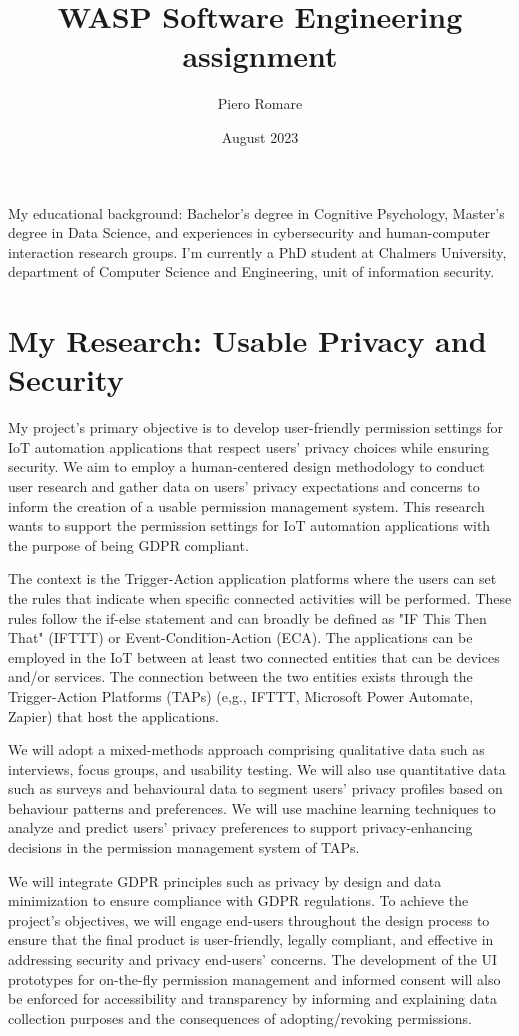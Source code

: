 \documentclass[11pt]{article}
\title{WASP Software Engineering assignment}
\author{Piero Romare}
\date{August 2023}
\begin{document}
\maketitle

My educational background: Bachelor's degree in Cognitive Psychology, Master's degree in Data Science, and experiences in cybersecurity and human-computer interaction research groups. I'm currently a PhD student at Chalmers University, department of Computer Science and Engineering, unit of information security.

\section{My Research: Usable Privacy and Security}\label{sec:1}
My project's primary objective is to develop user-friendly permission settings for IoT automation applications that respect users' privacy choices while ensuring security. We aim to employ a human-centered design methodology to conduct user research and gather data on users' privacy expectations and concerns to inform the creation of a usable permission management system. This research wants to support the permission settings for IoT automation applications with the purpose of being GDPR compliant.

The context is the Trigger-Action application platforms where the users can set the rules that indicate when specific connected activities will be performed. These rules follow the if-else statement and can broadly be defined as "IF This Then That" (IFTTT) or Event-Condition-Action (ECA). The applications can be employed in the IoT between at least two connected entities that can be devices and/or services. The connection between the two entities exists through the Trigger-Action Platforms (TAPs) (e,g., IFTTT, Microsoft Power Automate, Zapier) that host the applications. 

We will adopt a mixed-methods approach comprising qualitative data such as interviews, focus groups, and usability testing. We will also use quantitative data such as surveys and behavioural data to segment users' privacy profiles based on behaviour patterns and preferences. We will use machine learning techniques to analyze and predict users' privacy preferences to support privacy-enhancing decisions in the permission management system of TAPs.

We will integrate GDPR principles such as privacy by design and data minimization to ensure compliance with GDPR regulations. To achieve the project's objectives, we will engage end-users throughout the design process to ensure that the final product is user-friendly, legally compliant, and effective in addressing security and privacy end-users' concerns. The development of the UI prototypes for on-the-fly permission management and informed consent will also be enforced for accessibility and transparency by informing and explaining data collection purposes and the consequences of adopting/revoking permissions.
\end{document}
